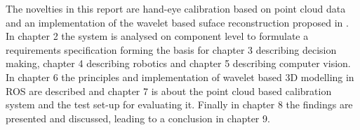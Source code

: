 The novelties in this report are hand-eye calibration based on point cloud data and an implementation of the wavelet based suface reconstruction proposed in \cite{Someone wielding the wavelet hanner...}.\\

In chapter 2 the system is analysed on component level to formulate a requirements specification forming the basis for chapter 3 describing decision making, chapter 4 describing robotics and chapter 5 describing computer vision. In chapter 6 the principles and implementation of wavelet based 3D modelling in ROS are described and chapter 7 is about the point cloud based calibration system and the test set-up for evaluating it. Finally in chapter 8 the findings are presented and discussed, leading to a conclusion in chapter 9.
